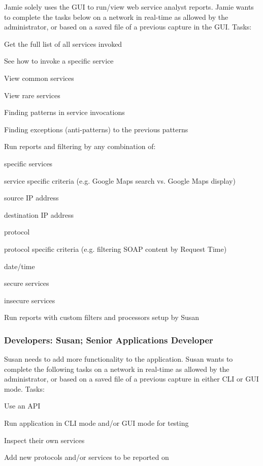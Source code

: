 \documentclass[titlepage]{article}
\begin{document}
Jamie solely uses the GUI to run/view web service analyst reports.  Jamie wants
to complete the tasks below on a network in real-time as allowed by the
administrator, or based on a saved file of a previous capture in the GUI.
%
Tasks:
\begin{itemize*}
    \item Get the full list of all services invoked
    \item See how to invoke a specific service
    \item View common services
    \item View rare services
    \item Finding patterns in service invocations
    \item Finding exceptions (anti-patterns) to the previous patterns
    \item Run reports and filtering by any combination of:
    \begin{itemize*}
        \item specific services
        \item service specific criteria (e.g. Google Maps search vs. Google Maps display)
        \item source IP address
        \item destination IP address
        \item protocol
        \item protocol specific criteria (e.g. filtering SOAP content by Request Time)
        \item date/time
        \item secure services
        \item insecure services
    \end{itemize*}
    \item Run reports with custom filters and processors setup by Susan
\end{itemize*}


\subsubsection{Developers: Susan; Senior Applications Developer%
  \label{susan}%
}

Susan needs to add more functionality to the application.  Susan wants to
complete the following tasks on a network in real-time as allowed by the administrator,
or based on a saved file of a previous capture in either CLI or GUI mode.
%
Tasks:
\begin{itemize*}
    \item Use an API
    \item Run application in CLI mode and/or GUI mode for testing
    \item Inspect their own services
    \item Add new protocols and/or services to be reported on
\end{itemize*}
\end{document}
